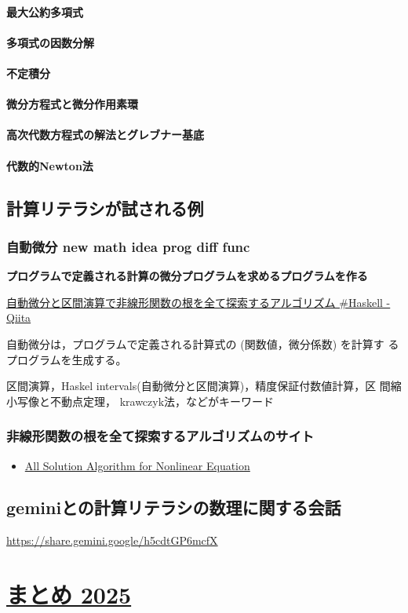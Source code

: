 \documentclass[dvipdfmx,11pat]{jarticle}
\begin{document}
\paragraph{最大公約多項式}
\label{sec:org342dfc5}

\paragraph{多項式の因数分解}
\label{sec:orgf41a8c3}

\paragraph{不定積分}
\label{sec:orgde9f3a1}

\paragraph{微分方程式と微分作用素環}
\label{sec:org003fee6}

\paragraph{高次代数方程式の解法とグレブナー基底}
\label{sec:org2902160}

\paragraph{代数的Newton法}
\label{sec:org337c32d}
\subsection{計算リテラシが試される例}
\label{sec:org9537151}
\subsubsection{自動微分 new math idea prog diff func}
\label{sec:orgb802414}

\textbf{プログラムで定義される計算の微分プログラムを求めるプログラムを作る}

\href{https://qiita.com/lotz/items/fd6c1c695fda6779585f}{自動微分と区間演算で非線形関数の根を全て探索するアルゴリズム \#Haskell - Qiita} 

自動微分は，プログラムで定義される計算式の (関数値，微分係数) を計算す
るプログラムを生成する。

区間演算，Haskel intervals(自動微分と区間演算)，精度保証付数値計算，区
間縮小写像と不動点定理， krawczyk法，などがキーワード
\subsubsection{非線形関数の根を全て探索するアルゴリズムのサイト}
\label{sec:org3a4b434}
\begin{itemize}
\item \href{https://verifiedby.me/kv/allsol/}{All Solution Algorithm for Nonlinear Equation}
\end{itemize}
\subsection{geminiとの計算リテラシの数理に関する会話}
\label{sec:org5ad1876}

\url{https://share.gemini.google/h5cdtGP6mcfX}
\section{\href{orgs/conclusion-2025.org}{まとめ 2025}}
\label{sec:orgd83b033}
\end{document}
